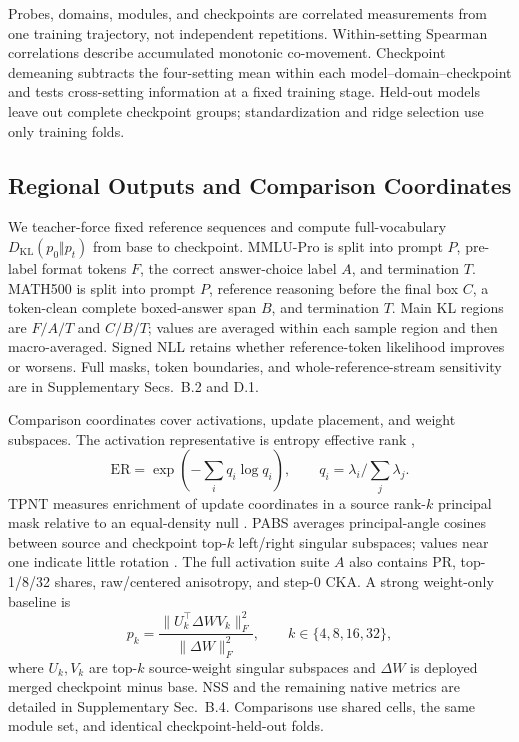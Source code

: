 \documentclass[letterpaper]{article} %
\begin{document}
Probes, domains, modules, and checkpoints are correlated measurements from one training
trajectory, not independent repetitions. Within-setting Spearman correlations describe
accumulated monotonic co-movement. Checkpoint demeaning subtracts the four-setting mean
within each model--domain--checkpoint and tests cross-setting information at a fixed
training stage. Held-out models leave out complete checkpoint groups; standardization
and ridge selection use only training folds.

\subsection{Regional Outputs and Comparison Coordinates}

We teacher-force fixed reference sequences and compute full-vocabulary
$D_{\mathrm{KL}}(p_0\Vert p_t)$ from base to checkpoint. MMLU-Pro is split into prompt
$P$, pre-label format tokens $F$, the correct answer-choice label $A$, and termination
$T$. MATH500 is split into prompt $P$, reference reasoning before the final box $C$, a
token-clean complete boxed-answer span $B$, and termination $T$. Main KL regions are
$F/A/T$ and $C/B/T$; values are averaged within each sample region and then
macro-averaged. Signed NLL retains whether reference-token likelihood improves or worsens.
Full masks, token boundaries, and whole-reference-stream sensitivity are in Supplementary
Secs.~B.2 and D.1.

Comparison coordinates cover activations, update placement, and weight subspaces. The
activation representative is entropy effective rank \citep{liu2026collapse},
\begin{equation}
\mathrm{ER}=\exp\!\left(-\sum_iq_i\log q_i\right),\qquad
q_i=\lambda_i/\sum_j\lambda_j.
\end{equation}
TPNT measures enrichment of update coordinates in a source rank-$k$ principal mask
relative to an equal-density null \citep{yu2026dense,zhu2025path}. PABS averages principal-angle cosines between source
and checkpoint top-$k$ left/right singular subspaces; values near one indicate little
rotation \citep{jin2025rlheals}. The full activation suite $A$ also contains PR, top-1/8/32 shares,
raw/centered anisotropy, and step-0 CKA. A strong weight-only baseline \citep{yu2026dense} is
\begin{equation}
p_k=\frac{\|U_k^\top\Delta W V_k\|_F^2}{\|\Delta W\|_F^2},
\qquad k\in\{4,8,16,32\},
\label{eq:pk}
\end{equation}
where $U_k,V_k$ are top-$k$ source-weight singular subspaces and $\Delta W$ is deployed
merged checkpoint minus base. NSS and the remaining native metrics are detailed in
Supplementary Sec.~B.4. Comparisons use shared cells, the same module set, and identical
checkpoint-held-out folds.
\end{document}
